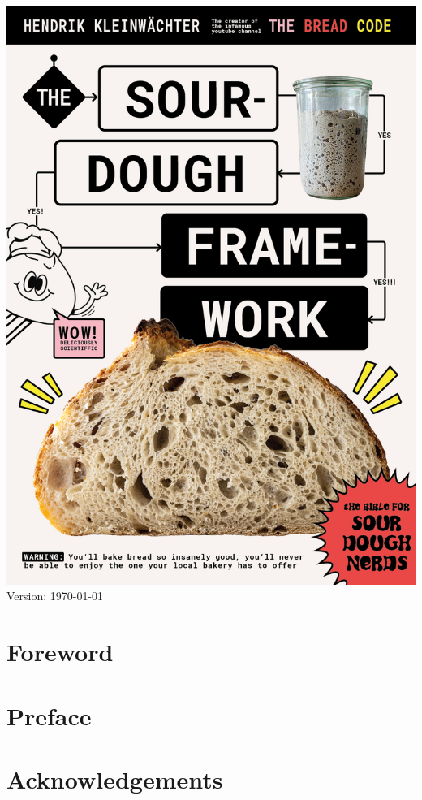 \documentclass[a4paper, 12pt]{book}
\begin{document}
\begin{titlepage}
	\centering
  \includegraphics[width=\textwidth]{cover-page}
  Version:
  \today
\end{titlepage}

\frontmatter

\tableofcontents

\chapter{Foreword}


\chapter{Preface}


\chapter{Acknowledgements}

\end{document}
